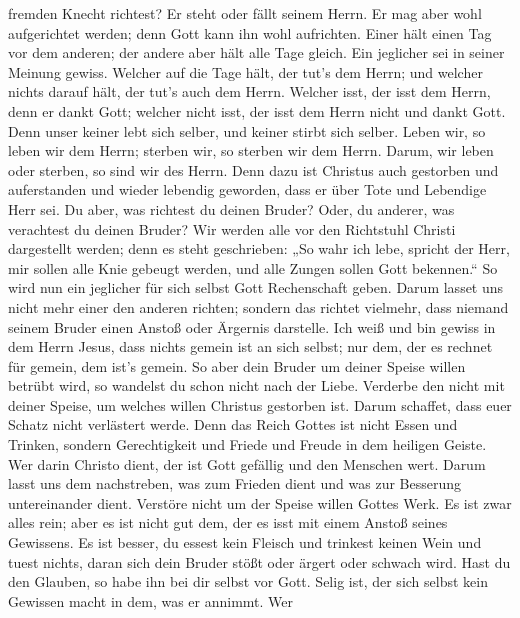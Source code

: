 fremden Knecht richtest? Er steht oder fällt seinem Herrn. Er mag aber
wohl aufgerichtet werden; denn Gott kann ihn wohl aufrichten.
 Einer hält einen Tag vor dem anderen; der andere aber hält
alle Tage gleich. Ein jeglicher sei in seiner Meinung gewiss.
 Welcher auf die Tage hält, der tut's dem Herrn; und welcher
nichts darauf hält, der tut's auch dem Herrn. Welcher isst, der isst dem
Herrn, denn er dankt Gott; welcher nicht isst, der isst dem Herrn nicht
und dankt Gott.  Denn unser keiner lebt sich selber, und
keiner stirbt sich selber.  Leben wir, so leben wir dem
Herrn; sterben wir, so sterben wir dem Herrn. Darum, wir leben oder
sterben, so sind wir des Herrn.  Denn dazu ist Christus auch
gestorben und auferstanden und wieder lebendig geworden, dass er über
Tote und Lebendige Herr sei.  Du aber, was richtest du
deinen Bruder? Oder, du anderer, was verachtest du deinen Bruder? Wir
werden alle vor den Richtstuhl Christi dargestellt werden; 
denn es steht geschrieben: „So wahr ich lebe, spricht der Herr, mir
sollen alle Knie gebeugt werden, und alle Zungen sollen Gott bekennen.``
 So wird nun ein jeglicher für sich selbst Gott
Rechenschaft geben.  Darum lasset uns nicht mehr einer den
anderen richten; sondern das richtet vielmehr, dass niemand seinem
Bruder einen Anstoß oder Ärgernis darstelle.  Ich weiß und
bin gewiss in dem Herrn Jesus, dass nichts gemein ist an sich selbst;
nur dem, der es rechnet für gemein, dem ist's gemein.  So
aber dein Bruder um deiner Speise willen betrübt wird, so wandelst du
schon nicht nach der Liebe. Verderbe den nicht mit deiner Speise, um
welches willen Christus gestorben ist.  Darum schaffet,
dass euer Schatz nicht verlästert werde.  Denn das Reich
Gottes ist nicht Essen und Trinken, sondern Gerechtigkeit und Friede und
Freude in dem heiligen Geiste.  Wer darin Christo dient,
der ist Gott gefällig und den Menschen wert.  Darum lasst
uns dem nachstreben, was zum Frieden dient und was zur Besserung
untereinander dient.  Verstöre nicht um der Speise willen
Gottes Werk. Es ist zwar alles rein; aber es ist nicht gut dem, der es
isst mit einem Anstoß seines Gewissens.  Es ist besser, du
essest kein Fleisch und trinkest keinen Wein und tuest nichts, daran
sich dein Bruder stößt oder ärgert oder schwach wird.  Hast
du den Glauben, so habe ihn bei dir selbst vor Gott. Selig ist, der sich
selbst kein Gewissen macht in dem, was er annimmt.  Wer
